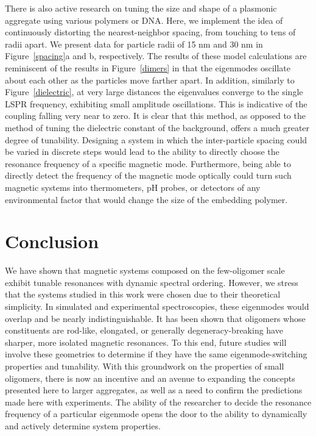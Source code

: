\documentclass[journal=ancac3,manuscript=article]{achemso}
\begin{document}
There is also active research on tuning the size and shape of a plasmonic aggregate using various polymers\cite{Ginger2017} or DNA\cite{DanLuo2009,NaLiu2017}. Here, we implement the idea of continuously distorting the nearest-neighbor spacing, from touching to tens of radii apart. We present data for particle radii of 15 nm and 30 nm in Figure~\ref{spacing}a and b, respectively. The results of these model calculations are reminiscent of the results in Figure~\ref{dimers} in that the eigenmodes oscillate about each other as the particles move farther apart. In addition, similarly to Figure~\ref{dielectric}, at very large distances the eigenvalues converge to the single LSPR frequency, exhibiting small amplitude oscillations. This is indicative of the coupling falling very near to zero. It is clear that this method, as opposed to the method of tuning the dielectric constant of the background, offers a much greater degree of tunability. Designing a system in which the inter-particle spacing could be varied in discrete steps would lead to the ability to directly choose the resonance frequency of a specific magnetic mode. Furthermore, being able to directly detect the frequency of the magnetic mode optically could turn such magnetic systems into thermometers, pH probes, or detectors of any environmental factor that would change the size of the embedding polymer.


\section{Conclusion}
We have shown that magnetic systems composed on the few-oligomer scale exhibit tunable resonances with dynamic spectral ordering. However, we stress that the systems studied in this work were chosen due to their theoretical simplicity. In simulated and experimental spectroscopies, these eigenmodes would overlap and be nearly indistinguishable. It has been shown that oligomers whose constituents are rod-like, elongated, or generally degeneracy-breaking have sharper, more isolated magnetic resonances\cite{Cherqui2016}. To this end, future studies will involve these geometries to determine if they have the same eigenmode-switching properties and tunability. With this groundwork on the properties of small oligomers, there is now an incentive and an avenue to expanding the concepts presented here to larger aggregates, as well as a need to confirm the predictions made here with experiments. The ability of the researcher to decide the resonance frequency of a particular eigenmode opens the door to the ability to dynamically and actively determine system properties.
\end{document}
